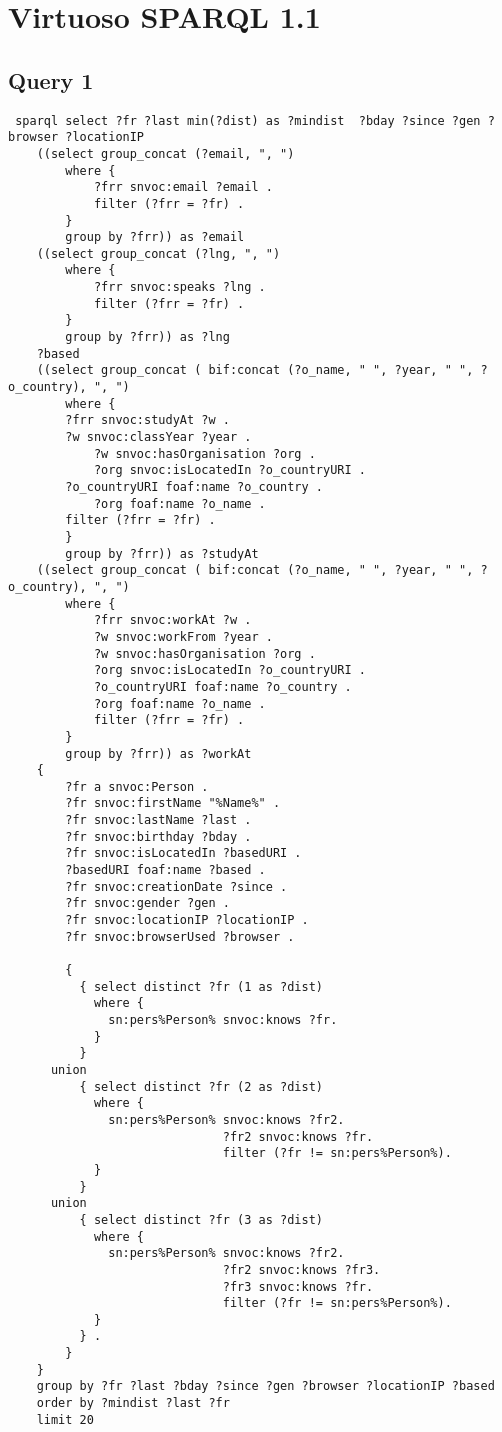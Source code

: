 
\section{Virtuoso SPARQL 1.1}

\subsection{Query 1} 
{\footnotesize
\begin{verbatim}
 sparql select ?fr ?last min(?dist) as ?mindist  ?bday ?since ?gen ?browser ?locationIP 
    ((select group_concat (?email, ", ")
        where {
            ?frr snvoc:email ?email .
            filter (?frr = ?fr) .
        }
        group by ?frr)) as ?email
    ((select group_concat (?lng, ", ")
        where {
            ?frr snvoc:speaks ?lng .
            filter (?frr = ?fr) .
        }
        group by ?frr)) as ?lng
    ?based
    ((select group_concat ( bif:concat (?o_name, " ", ?year, " ", ?o_country), ", ")
        where {
        ?frr snvoc:studyAt ?w .
        ?w snvoc:classYear ?year .
            ?w snvoc:hasOrganisation ?org .
            ?org snvoc:isLocatedIn ?o_countryURI .
        ?o_countryURI foaf:name ?o_country .
            ?org foaf:name ?o_name .
        filter (?frr = ?fr) .
        }
        group by ?frr)) as ?studyAt
    ((select group_concat ( bif:concat (?o_name, " ", ?year, " ", ?o_country), ", ")
        where {
            ?frr snvoc:workAt ?w .
            ?w snvoc:workFrom ?year .
            ?w snvoc:hasOrganisation ?org .
            ?org snvoc:isLocatedIn ?o_countryURI .
            ?o_countryURI foaf:name ?o_country .
            ?org foaf:name ?o_name .
            filter (?frr = ?fr) .
        }
        group by ?frr)) as ?workAt
    {
        ?fr a snvoc:Person .
        ?fr snvoc:firstName "%Name%" .
        ?fr snvoc:lastName ?last .
        ?fr snvoc:birthday ?bday .
        ?fr snvoc:isLocatedIn ?basedURI .
        ?basedURI foaf:name ?based .
        ?fr snvoc:creationDate ?since .
        ?fr snvoc:gender ?gen .
        ?fr snvoc:locationIP ?locationIP .
        ?fr snvoc:browserUsed ?browser .

        {
          { select distinct ?fr (1 as ?dist)
            where {
              sn:pers%Person% snvoc:knows ?fr.
            }
          }
      union
          { select distinct ?fr (2 as ?dist)
            where {
              sn:pers%Person% snvoc:knows ?fr2. 
                              ?fr2 snvoc:knows ?fr.
                              filter (?fr != sn:pers%Person%).
            }
          }
      union
          { select distinct ?fr (3 as ?dist)
            where {
              sn:pers%Person% snvoc:knows ?fr2. 
                              ?fr2 snvoc:knows ?fr3. 
                              ?fr3 snvoc:knows ?fr. 
                              filter (?fr != sn:pers%Person%).
            }
          } .
        }
    }
    group by ?fr ?last ?bday ?since ?gen ?browser ?locationIP ?based
    order by ?mindist ?last ?fr
    limit 20
\end{verbatim}
}
 

